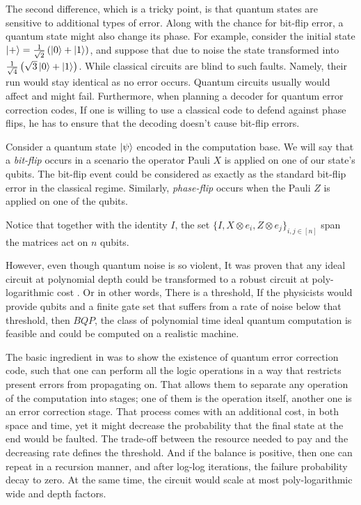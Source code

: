 The second difference, which is a tricky point, is that quantum states are sensitive to additional types of error. Along with the chance for bit-flip error, a quantum state might also change its phase. For example, consider the initial state $\ket{+} = \frac{1}{\sqrt{2}}\left( \ket{0} + \ket{1} \right)$, and suppose that due to noise the state transformed into $\frac{1}{\sqrt{4}}\left( \sqrt{3}\ket{0} + \ket{1} \right)$. While classical circuits are blind to such faults. Namely, their run would stay identical as no error occurs. Quantum circuits usually would affect and might fail. Furthermore, when planning a decoder for quantum error correction codes, If one is willing to use a classical code to defend against phase flips, he has to ensure that the decoding doesn't cause bit-flip errors. 
\begin{definition} \label{def:bphf}  
  Consider a quantum state $\ket{\psi}$ encoded in the computation base. We will say that a \textit{bit-flip} occurs in a scenario the operator Pauli $X$ is applied on one of our state's qubits. The bit-flip event could be considered as exactly as the standard bit-flip error in the classical regime. Similarly, \textit{phase-flip} occurs when the Pauli $Z$ is applied on one of the qubits. 

  Notice that together with the identity $I$, the set $\{I, X \otimes e_{i} , Z \otimes e_{j} \}_{i,j \in [n]}$ span the matrices act on $n$ qubits.  
\end{definition}

However, even though quantum noise is so violent, It was proven that any ideal circuit at polynomial depth could be transformed to a robust circuit at poly-logarithmic cost \cite{aharonov1999faulttolerant}. Or in other words, There is a threshold, If the physicists would provide qubits and a finite gate set that suffers from a rate of noise below that threshold, then $BQP$, the class of polynomial time ideal quantum computation is feasible and could be computed on a realistic machine.                

The basic ingredient in \cite{aharonov1999faulttolerant} was to show the existence of quantum error correction code, such that one can perform all the logic operations in a way that restricts present errors from propagating on. That allows them to separate any operation of the computation into stages; one of them is the operation itself, another one is an error correction stage. That process comes with an additional cost, in both space and time, yet it might decrease the probability that the final state at the end would be faulted. The trade-off between the resource needed to pay and the decreasing rate defines the threshold. And if the balance is positive, then one can repeat in a recursion manner, and after log-log iterations, the failure probability decay to zero. At the same time, the circuit would scale at most poly-logarithmic wide and depth factors.      

